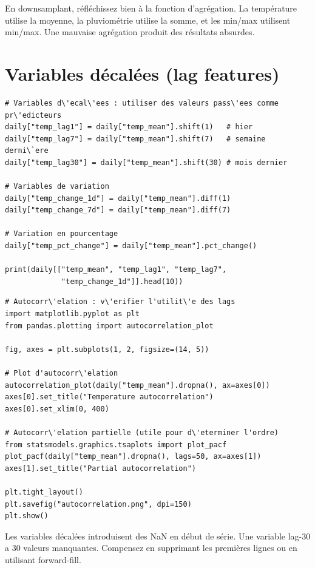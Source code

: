 \begin{preprocesstip}
En downsamplant, r\'efl\'echissez bien \`a la fonction d'agr\'egation. La temp\'erature utilise la moyenne, la pluviom\'etrie utilise la somme, et les min/max utilisent min/max. Une mauvaise agr\'egation produit des r\'esultats absurdes.
\end{preprocesstip}

\section{Variables d\'ecal\'ees (lag features)}

\begin{verbatim}
# Variables d\'ecal\'ees : utiliser des valeurs pass\'ees comme pr\'edicteurs
daily["temp_lag1"] = daily["temp_mean"].shift(1)   # hier
daily["temp_lag7"] = daily["temp_mean"].shift(7)   # semaine derni\`ere
daily["temp_lag30"] = daily["temp_mean"].shift(30) # mois dernier

# Variables de variation
daily["temp_change_1d"] = daily["temp_mean"].diff(1)
daily["temp_change_7d"] = daily["temp_mean"].diff(7)

# Variation en pourcentage
daily["temp_pct_change"] = daily["temp_mean"].pct_change()

print(daily[["temp_mean", "temp_lag1", "temp_lag7",
             "temp_change_1d"]].head(10))
\end{verbatim}

\begin{verbatim}
# Autocorr\'elation : v\'erifier l'utilit\'e des lags
import matplotlib.pyplot as plt
from pandas.plotting import autocorrelation_plot

fig, axes = plt.subplots(1, 2, figsize=(14, 5))

# Plot d'autocorr\'elation
autocorrelation_plot(daily["temp_mean"].dropna(), ax=axes[0])
axes[0].set_title("Temperature autocorrelation")
axes[0].set_xlim(0, 400)

# Autocorr\'elation partielle (utile pour d\'eterminer l'ordre)
from statsmodels.graphics.tsaplots import plot_pacf
plot_pacf(daily["temp_mean"].dropna(), lags=50, ax=axes[1])
axes[1].set_title("Partial autocorrelation")

plt.tight_layout()
plt.savefig("autocorrelation.png", dpi=150)
plt.show()
\end{verbatim}

\begin{warningbox}
Les variables d\'ecal\'ees introduisent des NaN en d\'ebut de s\'erie. Une variable lag-30 a 30 valeurs manquantes. Compensez en supprimant les premi\`eres lignes ou en utilisant forward-fill.
\end{warningbox}

